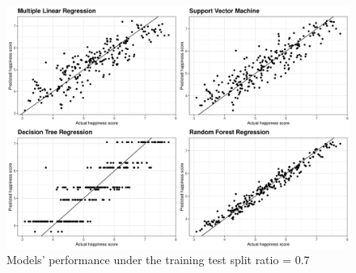 \documentclass[11pt,a4paper,]{article}
\begin{document}
\begin{figure}

{\centering \includegraphics[width=0.7\linewidth]{figure/ggsp07} 

}

\caption{Models' performance under the training test split ratio = 0.7}\label{fig:ggsp07}
\end{figure}

\clearpage

\printbibliography
\end{document}
